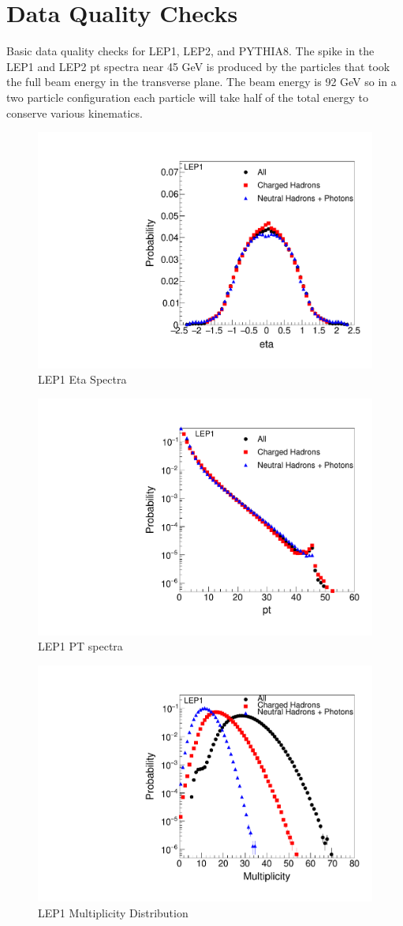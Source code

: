 \section{Data Quality Checks}


Basic data quality checks for LEP1, LEP2, and PYTHIA8. The spike in the LEP1 and LEP2 pt spectra near 45 GeV is produced by the particles that took the full beam energy in the transverse plane. The beam energy is 92 GeV so in a two particle configuration each particle will take half of the total energy to conserve various kinematics. 


\begin{figure}[!htb]
\begin{center}
\includegraphics[width=.45\textwidth]{images/DataQualityCheck/LEP1_eta.pdf}
\caption{LEP1 Eta Spectra}
\label{fig:figure1} 
\end{center}
\end{figure}

\begin{figure}[!htb]
\begin{center}
\includegraphics[width=.45\textwidth]{images/DataQualityCheck/LEP1_pt.pdf}
\caption{LEP1 PT spectra}
\label{fig:figure2} 
\end{center}
\end{figure}

\begin{figure}[!htb]
\begin{center}
\includegraphics[width=.45\textwidth]{images/DataQualityCheck/LEP1_mult.pdf}
\caption{LEP1 Multiplicity Distribution}
\label{fig:figure3} 
\end{center}
\end{figure}

